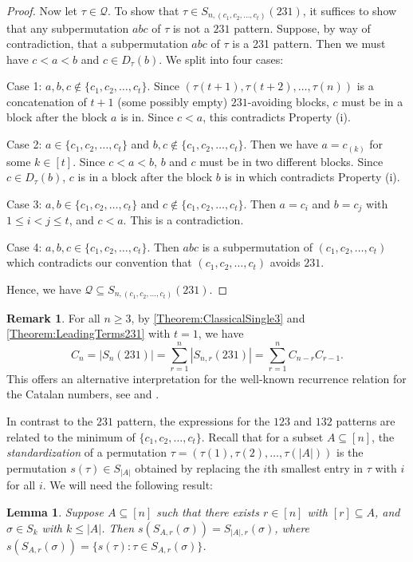 \documentclass[11pt]{article}
\newtheorem{lemma}[theorem]{Lemma}
\theoremstyle{definition}
\newtheorem{remark}[theorem]{Remark}
\numberwithin{equation}{section}
\begin{document}
\begin{proof}
Now let $\tau\in\mathcal{Q}$. To show that $\tau\in S_{n,(c_1,c_2,\ldots,c_t)}(231)$, it suffices to show that any subpermutation $abc$ of $\tau$ is not a $231$ pattern. Suppose, by way of contradiction, that a subpermutation $abc$ of $\tau$ is a 231 pattern. Then we must have $c<a<b$ and $c\in D_\tau(b)$. We split into four cases:

Case 1: $a,b,c\notin\{c_1,c_2,\ldots,c_t\}$. Since $(\tau(t+1),\tau(t+2),\ldots,\tau(n))$ is a concatenation of $t+1$ (some possibly empty) $231$-avoiding blocks, $c$ must be in a block after the block $a$ is in. Since $c<a$, this contradicts Property (i).

Case 2: $a\in\{c_1,c_2,\ldots,c_t\}$ and $b,c\notin\{c_1,c_2,\ldots,c_t\}$. Then we have $a=c_{(k)}$ for some $k\in[t]$. Since $c<a<b$, $b$ and $c$ must be in two different blocks. Since $c\in D_\tau(b)$, $c$ is in a block after the block $b$ is in which contradicts Property (i).

Case 3: $a,b\in\{c_1,c_2,\ldots,c_t\}$ and $c\notin\{c_1,c_2,\ldots,c_t\}$. Then $a=c_i$ and $b=c_j$ with $1\leq i<j\leq t$, and $c<a$. This is a contradiction. 

Case 4: $a,b,c\in\{c_1,c_2,\ldots,c_t\}$. Then $abc$ is a subpermutation of $(c_1,c_2,\ldots,c_t)$ which contradicts our convention that $(c_1,c_2,\ldots,c_t)$ avoids $231$.

Hence, we have $\mathcal{Q}\subseteq S_{n,(c_1,c_2,\ldots,c_t)}(231)$.
\end{proof}

\begin{remark}
For all $n\geq3$, by \cref{Theorem:ClassicalSingle3} and \cref{Theorem:LeadingTerms231} with $t=1$, we have
\[
C_n=|S_n(231)|=\sum_{r=1}^n|S_{n,r}(231)|=\sum_{r=1}^nC_{n-r}C_{r-1}.
\]
This offers an alternative interpretation 
for the well-known recurrence relation for the 
Catalan numbers, see \cite[Section 3.2]{EgeciogluGarsia2021} and \cite[Section 1.2]{Stanley2015}. 
\end{remark}

In contrast to the $231$ pattern, the expressions for the $123$ and $132$ patterns are related to the minimum of $\{c_1,c_2,\ldots,c_t\}$. Recall that for a subset $A\subseteq[n]$, the \textit{standardization} of a permutation $\tau=(\tau(1),\tau(2),\ldots,\tau(|A|))$ is the permutation $s(\tau)\in S_{|A|}$ obtained by replacing the $i$th smallest entry in $\tau$ with $i$ for all $i$. We will need the following result:

\begin{lemma}\label{Lemma:StandardizationLeadingTerm}
Suppose $A\subseteq[n]$ such that there exists $r\in[n]$ with $[r]\subseteq A$, and $\sigma\in S_k$ with $k \leq |A|$. Then $s(S_{A,r}(\sigma))=S_{|A|,r}(\sigma)$, where $s(S_{A,r}(\sigma))=\{s(\tau):\tau\in S_{A,r}(\sigma)\}$.
\end{lemma}
\end{document}
